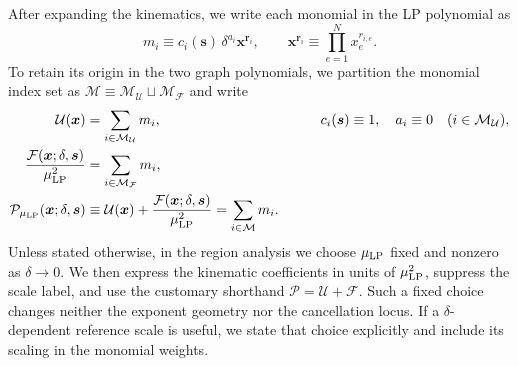 \documentclass[a4paper,11pt]{article}
\newcommand{\x}{\boldsymbol{x}}
\newcommand{\s}{\boldsymbol{s}}
\begin{document}
After expanding the kinematics, we write each monomial in the LP polynomial as
\begin{equation}
 m_i\equiv c_i(\s)\,\delta^{a_i}\x^{\boldsymbol r_i},
 \qquad
 \x^{\boldsymbol r_i}\equiv\prod_{e=1}^{N}x_e^{r_{i,e}}.
\label{eq:monomial-definition}
\end{equation}
To retain its origin in the two graph polynomials, we partition the monomial
index set as
\(\mathcal M\equiv
\mathcal M_{\mathcal U}\sqcup\mathcal M_{\mathcal F}\) and write
\begin{equation}
 \begin{aligned}
 \mathcal U(\x)
 &=\sum_{i\in\mathcal M_{\mathcal U}}m_i,
 &\qquad
 c_i(\s)&\equiv1,\quad a_i\equiv0
 \quad(i\in\mathcal M_{\mathcal U}),\\
 \frac{\mathcal F(\x;\delta,\s)}{\mu_{\rm LP}^2}
 &=\sum_{i\in\mathcal M_{\mathcal F}}m_i,\\
 \mathcal P_{\mu_{\rm LP}}(\x;\delta,\s)
 &\equiv\mathcal U(\x)
   +\frac{\mathcal F(\x;\delta,\s)}{\mu_{\rm LP}^2}
 =\sum_{i\in\mathcal M}m_i.
 \end{aligned}
\label{eq:Pmonomials}
\end{equation}
Unless stated otherwise, in the region analysis we choose \(\mu_{\rm LP}\)
fixed and nonzero as \(\delta\to0\).  We then express the kinematic
coefficients in units of \(\mu_{\rm LP}^2\), suppress the scale label, and use
the customary shorthand \(\mathcal P=\mathcal U+\mathcal F\).  Such a fixed
choice changes neither the exponent geometry nor the cancellation locus.  If
a \(\delta\)-dependent reference scale is useful, we state that choice
explicitly and include its scaling in the monomial weights.
\end{document}
